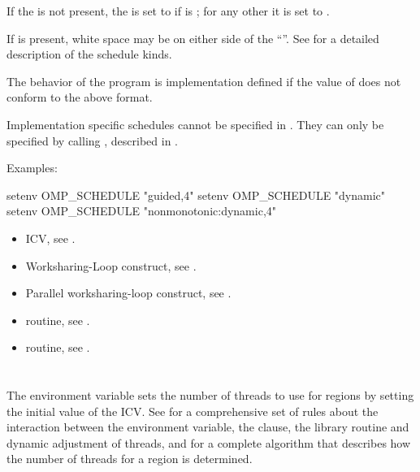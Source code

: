 If the  is not present, the  is set to 
 if  is ; for any other  
it is set to .

If  is present, white space may be on either side of the 
``\code{,}''. See  for a detailed 
description of the schedule kinds.

The behavior of the program is implementation defined if the value of 
 does not conform to the above format.

Implementation specific schedules cannot be specified in . 
They can only be specified by calling , described in 
.

Examples:

\begin{ompEnv}
setenv OMP_SCHEDULE "guided,4"
setenv OMP_SCHEDULE "dynamic"
setenv OMP_SCHEDULE "nonmonotonic:dynamic,4"
\end{ompEnv}

\crossreferences
\begin{itemize}
\item {} ICV, see .

\item Worksharing-Loop construct, see .

\item Parallel worksharing-loop construct, 
see .

\item {} routine, see .

\item {} routine, see .
\end{itemize}



\section{}
\label{sec:OMP_NUM_THREADS}
The  environment variable sets the number of threads 
to use for  regions by setting the initial value of the 
 ICV. See  for 
a comprehensive set of rules about the interaction between the
 environment variable, the  clause, the
 library routine and dynamic adjustment of threads, and
for a complete algorithm that describes how the number of
threads for a  region is determined.


